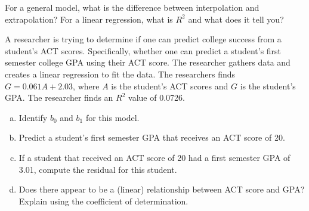 \documentclass[11pt,letterpaper]{article}
\begin{document}

 For a general model, what is the difference between interpolation and extrapolation? For a linear regression, what is $R^2$ and what does it tell you?



\newpage



 A researcher is trying to determine if one can predict college success from a student's ACT scores. Specifically, whether one can predict a student's first semester college GPA using their ACT score. The researcher gathers data and creates a linear regression to fit the data. The researchers finds $G= 0.061A + 2.03$, where $A$ is the student's ACT scores and $G$ is the student's GPA. The researcher finds an $R^2$ value of 0.0726. 
	\begin{enumerate}[(a)]
	\item Identify $b_0$ and $b_1$ for this model.
	\item Predict a student's first semester GPA that receives an ACT score of 20. 
	\item If a student that received an ACT score of 20 had a first semester GPA of 3.01, compute the residual for this student. 
	\item Does there appear to be a (linear) relationship between ACT score and GPA? Explain using the coefficient of determination. 
	\end{enumerate}



\newpage
\end{document}
